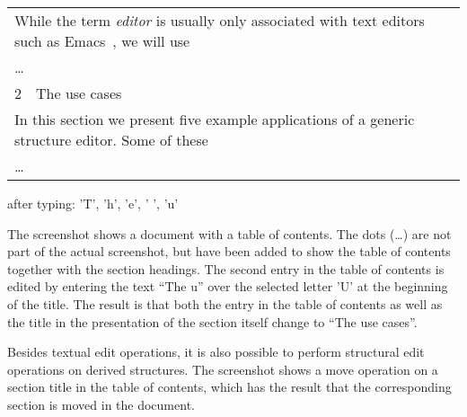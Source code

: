 {\begin{tabular}[t]{p{5.2cm}}
While the term {\em editor} is usually only associated with text editors such as Emacs~\cite{stallman81emacs}, we will use \\
\dots \\
\vspace{0.005cm}
{\small 2~~The use cases}\\
\vspace{0.001cm}
In this section we present five example applications of a generic structure editor. Some of these \\
\dots
\end{tabular}
}{}{after typing: 'T', 'h', 'e', ' ', 'u'}

The screenshot shows a document with a table of contents. The dots (\dots) are not part of the actual screenshot, but have been added to show the table of contents together with the section headings. The second entry in the table of contents is edited by entering the text ``The u'' over the selected letter 'U' at the beginning of the title. The result is that both the entry in the table of contents as well as the title in the presentation of the section itself change to ``The use cases''.


Besides textual edit operations, it is also possible to perform structural edit operations on derived structures. The screenshot shows a move operation on a section title in the table of contents, which has the result that the corresponding section is moved in the document.

